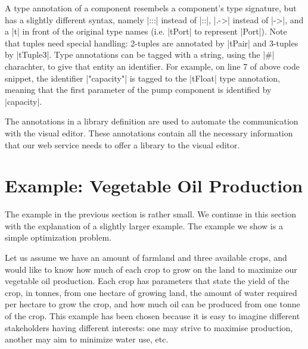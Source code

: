 \documentclass[a4paper]{article}
\begin{document}
A type annotation of a component resembels a component's type signature, but has
a slightly different syntax, namely |:::| instead of |::|, |.->| instead of
|->|, and a |t| in front of the original type names (i.e. |tPort| to represent
|Port|). Note that tuples need special handling: 2-tuples are annotated by
|tPair| and 3-tuples by |tTuple3|. Type annotations can be tagged with a string,
using the |#| charachter, to give that entity an identifier.  For example, on
line 7 of above code snippet, the identifier |"capacity"| is tagged to the
|tFloat| type annotation, meaning that the first parameter of the pump component
is identified by |capacity|. 

The annotations in a library definition are used to automate the communication
with the visual editor. These annotations contain all the necessary information
that our web service needs to offer a library to the visual editor. 


\section{Example: Vegetable Oil Production}

The example in the previous section is rather small. We continue in this section
with the explanation of a slightly larger example. The example we show is a
simple optimization problem.

Let us assume we have an amount of farmland and three available crops, and would
like to know how much of each crop to grow on the land to maximize our vegetable
oil production. Each crop has parameters that state the yield of the crop, in
tonnes, from one hectare of growing land, the amount of water required per
hectare to grow the crop, and how much oil can be produced from one tonne of the
crop.
%
This example has been chosen because it is easy to imagine different
stakeholders having different interests: one may strive to maximise
production, another may aim to minimize water use, etc.
\end{document}
